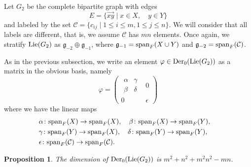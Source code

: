 \documentclass[12pt]{amsart}
\newtheorem{proposition}[teo]{Proposition}
\begin{document}
Let $G_2$ be the complete bipartite graph with edges 
\[
E=\{\overrightarrow{xy}\mid x\in X,\quad y\in Y\}
\]
and labeled by the set ${\mathcal C}=\{c_{ij}\mid 1\leq i \leq m, 1\leq j\leq n\}$. We will consider that all labels are different, that is, we assume ${\mathcal C}$ has $mn$ elements. Once again, we stratify ${\rm Lie}(G_2)$ as ${\mathfrak g}_{-2}\oplus{\mathfrak g}_{-1}$, where ${\mathfrak g}_{-1}={\rm span}_F(X\cup Y)$ and ${\mathfrak g}_{-2}={\rm span}_F({\mathcal C})$.

As in the previous subsection, we write an element $\varphi\in{\rm Der}_0({\rm Lie}(G_2))$ as a matrix in the obvious basis, namely
\[
\varphi=\left(\begin{array}{c|c}\begin{array}{c|c}\alpha&\gamma\\\hline\beta&\delta\end{array}&0\\\hline0&\epsilon\end{array}\right)
\]
where we have the linear maps
\begin{eqnarray*}
&\alpha\colon{\rm span}_F(X)\to{\rm span}_F(X),\quad\beta\colon{\rm span}_F(X)\to{\rm span}_F(Y),&\\
&\gamma\colon{\rm span}_F(Y)\to{\rm span}_F(X),\quad\delta\colon{\rm span}_F(Y)\to{\rm span}_F(Y),&\\
&\epsilon\colon{\rm span}_F({\mathcal C})\to{\rm span}_F({\mathcal C}).&
\end{eqnarray*}

\begin{proposition}
The dimension of ${\rm Der}_0({\rm Lie}(G_2))$ is $m^2+n^2+m^2n^2-mn$.
\end{proposition}
\end{document}
